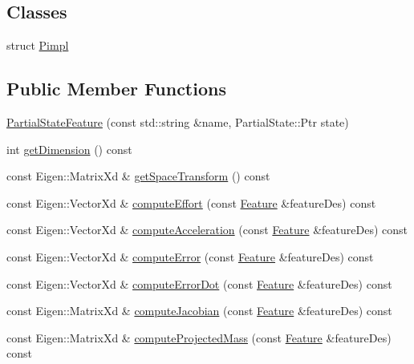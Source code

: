\subsection*{Classes}
\begin{DoxyCompactItemize}
\item 
struct \hyperlink{structocra_1_1PartialStateFeature_1_1Pimpl}{Pimpl}
\end{DoxyCompactItemize}
\subsection*{Public Member Functions}
\begin{DoxyCompactItemize}
\item 
\hyperlink{classocra_1_1PartialStateFeature_a07a8b02519ae7a77580f8e2deefc86dd}{Partial\+State\+Feature} (const std\+::string \&name, Partial\+State\+::\+Ptr state)
\item 
int \hyperlink{classocra_1_1PartialStateFeature_a70aa55f0974b03f1a71b30e924713d95}{get\+Dimension} () const 
\item 
const Eigen\+::\+Matrix\+Xd \& \hyperlink{classocra_1_1PartialStateFeature_a6ec615a3256fc19bc92ff11afa2ed312}{get\+Space\+Transform} () const 
\item 
const Eigen\+::\+Vector\+Xd \& \hyperlink{classocra_1_1PartialStateFeature_ae0b65e7879ebfb2e8bfe7d24277bc8ae}{compute\+Effort} (const \hyperlink{classocra_1_1Feature}{Feature} \&feature\+Des) const 
\item 
const Eigen\+::\+Vector\+Xd \& \hyperlink{classocra_1_1PartialStateFeature_a45d058aeb62316e29036c11d6f95fdd8}{compute\+Acceleration} (const \hyperlink{classocra_1_1Feature}{Feature} \&feature\+Des) const 
\item 
const Eigen\+::\+Vector\+Xd \& \hyperlink{classocra_1_1PartialStateFeature_ab91ba7b18161a7e7e16ff7ab92676819}{compute\+Error} (const \hyperlink{classocra_1_1Feature}{Feature} \&feature\+Des) const 
\item 
const Eigen\+::\+Vector\+Xd \& \hyperlink{classocra_1_1PartialStateFeature_a627ce227dc2d67976ab4781586d77e5a}{compute\+Error\+Dot} (const \hyperlink{classocra_1_1Feature}{Feature} \&feature\+Des) const 
\item 
const Eigen\+::\+Matrix\+Xd \& \hyperlink{classocra_1_1PartialStateFeature_ab82d8b070c0e6a9b87b62eb744760d05}{compute\+Jacobian} (const \hyperlink{classocra_1_1Feature}{Feature} \&feature\+Des) const 
\item 
const Eigen\+::\+Matrix\+Xd \& \hyperlink{classocra_1_1PartialStateFeature_a18843450201448d1be1b685e67e495ce}{compute\+Projected\+Mass} (const \hyperlink{classocra_1_1Feature}{Feature} \&feature\+Des) const 

\end{DoxyCompactItemize}
